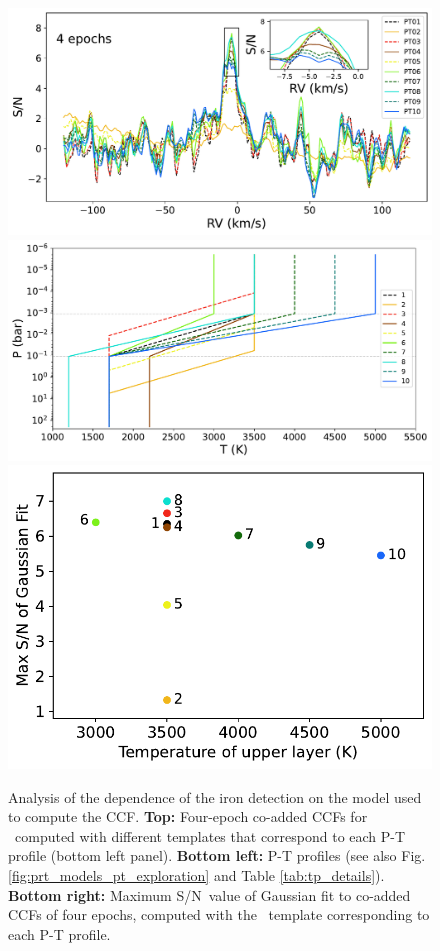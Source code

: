\documentclass{aa}
\newcommand{\feI}{\ion{Fe}{i}}
\newcommand{\snr}{S/N}
\begin{document}


\begin{figure}[h]
    \centering
    \includegraphics[width=0.90\hsize]{plots_submission2/W76b_Fe_ccf_snr_scaled_gauss_4timeseries_summed_planetframe_ecc_zero_all_TP10_compare_NEWg.pdf}
    \includegraphics[width=0.51\hsize]{plots_submission2/tp_profiles_range_10_colours_paper.pdf}
    \includegraphics[width=0.37\hsize]{plots_submission2/W76b_temp_vs_snr_top_layer_ecc_zero_PT1-10_NEWg.pdf}
    \caption{Analysis of the dependence of the iron detection on the model used to compute the CCF. \textbf{Top:} Four-epoch co-added CCFs for \feI\ computed with different templates that correspond to each P-T profile (bottom left panel). \textbf{Bottom left:} P-T profiles (see also Fig. \ref{fig:prt_models_pt_exploration} and Table \ref{tab:tp_details}). \textbf{Bottom right:} Maximum \snr\ value of Gaussian fit to co-added CCFs of four epochs, computed with the \feI\ template corresponding to each P-T profile.}
    \label{fig:tp_exploration}
\end{figure}
\end{document}

